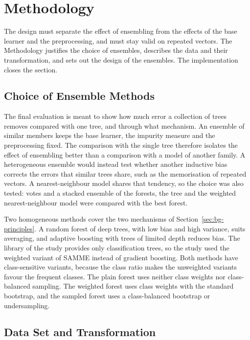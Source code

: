 \documentclass[10pt,conference]{IEEEtran}
\begin{document}
\section{Methodology}
\label{sec:methodology}

The design must separate the effect of ensembling from the effects of the base learner and the preprocessing, and must stay valid on repeated vectors. The Methodology justifies the choice of ensembles, describes the data and their transformation, and sets out the design of the ensembles. The implementation closes the section.

\subsection{Choice of Ensemble Methods}
\label{sec:meth-choice}

The final evaluation is meant to show how much error a collection of trees removes compared with one tree, and through what mechanism. An ensemble of similar members keeps the base learner, the impurity measure and the preprocessing fixed. The comparison with the single tree therefore isolates the effect of ensembling better than a comparison with a model of another family. A heterogeneous ensemble would instead test whether another inductive bias corrects the errors that similar trees share, such as the memorisation of repeated vectors. A nearest-neighbour model shares that tendency, so the choice was also tested: votes and a stacked ensemble of the forests, the tree and the weighted nearest-neighbour model were compared with the best forest.

Two homogeneous methods cover the two mechanisms of Section~\ref{sec:bg-principles}. A random forest of deep trees, with low bias and high variance, suits averaging, and adaptive boosting with trees of limited depth reduces bias. The library of the study provides only classification trees, so the study used the weighted variant of SAMME instead of gradient boosting. Both methods have class-sensitive variants, because the class ratio makes the unweighted variants favour the frequent classes. The plain forest uses neither class weights nor class-balanced sampling. The weighted forest uses class weights with the standard bootstrap, and the sampled forest uses a class-balanced bootstrap or undersampling.

\subsection{Data Set and Transformation}
\label{sec:meth-data}
\end{document}

